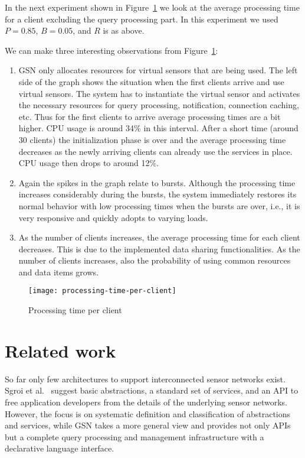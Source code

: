 In the next experiment shown in Figure~\ref{fig:ProcessingTimePerClient} we
look at the average processing time for a client excluding the query processing
part. In this experiment we used $P=0.85$, $B=0.05$, and $R$ is as above. 

We can make three interesting observations from
Figure~\ref{fig:ProcessingTimePerClient}:

\begin{enumerate}
\item  GSN only allocates resources for virtual sensors that are being
  used. The left side of the graph shows the situation when the first
  clients arrive and use virtual sensors. The system has to instantiate
  the virtual sensor and activates the necessary resources for query
  processing, notification, connection caching, etc. Thus for the
  first clients to arrive average processing times are a bit
  higher. CPU usage is around 34\% in this interval. After a short
  time (around 30 clients) the initialization phase is over and the
  average processing time decreases as the newly arriving clients can
  already use the services in place. CPU usage then drops to around
  12\%.
  
\item Again the spikes in the graph relate to bursts. Although the processing
  time increases considerably during the bursts, the system immediately
  restores its normal behavior with low processing times when the bursts are
  over, i.e., it is very responsive and quickly adopts to varying loads.

\item As the number of clients increases, the average processing time
  for each client decreases. This is due to the implemented data
  sharing functionalities. As the number of clients increases, also
  the probability of using common resources and data items grows.
\end{enumerate}

\begin{figure}%
  \centering
  \texttt{[image: processing-time-per-client]}
  \caption{Processing time per client}
  \label{fig:ProcessingTimePerClient}
\end{figure}

\section{Related work}
\label{sec:relatedwork}

So far only few architectures to support interconnected sensor networks exist.
Sgroi et al.~\cite{Sgroi05} suggest basic abstractions, a standard set of
services, and an API to free application developers from the details of the
underlying sensor networks.  However, the focus is on systematic definition and
classification of abstractions and services, while GSN takes a more general
view and provides not only APIs but a complete query processing and management
infrastructure with a declarative language interface.

